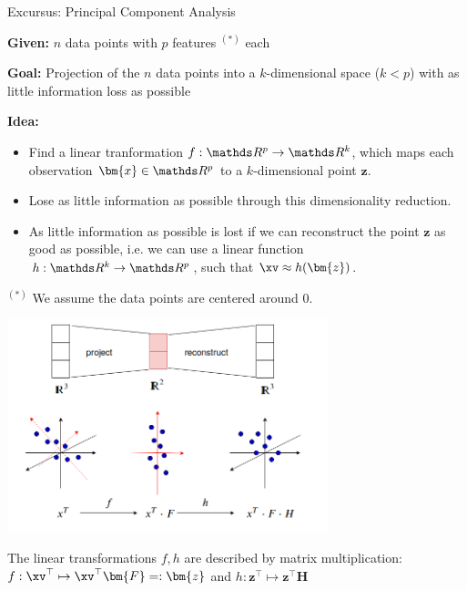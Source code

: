 \begin{vbframe}{Excursus: Principal Component Analysis}

\textbf{Given: } $n$ data points with $p$ features $^{(*)}$ each

\lz

\textbf{Goal: } Projection of the $n$ data points into a $k$-dimensional space ($k < p$) with as little information loss as possible

\lz

\textbf{Idea: }

\begin{itemize}
\item Find a linear tranformation $f: \R^p \to \R^k$, which maps each observation $\bm{x}\in \R^p$ to a $k$-dimensional point $\bm{z}$.
\item Lose as little information as possible through this dimensionality reduction.
\item As little information as possible is lost if we can reconstruct the point $\bm{z}$ as good as possible, i.e. we can use a linear function $h: \R^k \to \R^p$, such that $\xv \approx h(\bm{z})$.
\end{itemize}

\vfill

$^{(*)}$ We assume the data points are centered around $0$.

\framebreak

\begin{center}
  \includegraphics[width = 0.7\textwidth]{figure_man/ignore/matrixapproxi_s18.png}
\end{center}


The linear transformations $f, h$ are described by matrix multiplication: $f: \xv^\top \mapsto \xv^\top \bm{F} =: \bm{z}$ and $h: \bm{z}^\top \mapsto \bm{z}^\top \bm{H}$


\end{vbframe}
